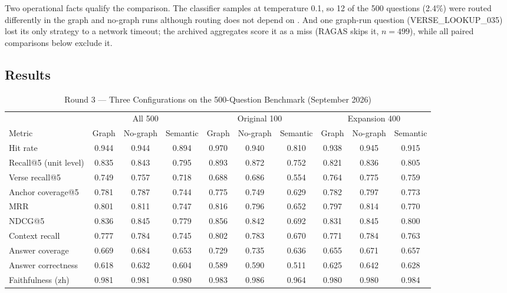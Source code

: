 Two operational facts qualify the comparison. The classifier samples at
temperature 0.1, so 12 of the 500 questions (2.4\%) were routed
differently in the graph and no-graph runs although routing does not
depend on . And one graph-run question
(VERSE\_LOOKUP\_035) lost its only strategy to a network timeout; the
archived aggregates score it as a miss (RAGAS skips it, $n=499$), while
all paired comparisons below exclude it.

\subsection{Results}

\begin{table}[!t]
\caption{Round 3 --- Three Configurations on the 500-Question Benchmark
(September 2026)}
\label{tab:round3}
\centering
\begin{threeparttable}
\begin{tabular}{@{}lccccccccc@{}}
\toprule
& \multicolumn{3}{c}{All 500} & \multicolumn{3}{c}{Original 100}
& \multicolumn{3}{c}{Expansion 400} \\
\cmidrule(lr){2-4}\cmidrule(lr){5-7}\cmidrule(lr){8-10}
Metric & Graph & No-graph & Semantic & Graph & No-graph & Semantic
& Graph & No-graph & Semantic \\
\midrule
Hit rate & 0.944 & 0.944 & 0.894 & 0.970 & 0.940 & 0.810 & 0.938 & 0.945 & 0.915 \\
Recall@5 (unit level)\tnote{a} & 0.835 & 0.843 & 0.795 & 0.893 & 0.872 & 0.752 & 0.821 & 0.836 & 0.805 \\
Verse recall@5 & 0.749 & 0.757 & 0.718 & 0.688 & 0.686 & 0.554 & 0.764 & 0.775 & 0.759 \\
Anchor coverage@5 & 0.781 & 0.787 & 0.744 & 0.775 & 0.749 & 0.629 & 0.782 & 0.797 & 0.773 \\
MRR & 0.801 & 0.811 & 0.747 & 0.816 & 0.796 & 0.652 & 0.797 & 0.814 & 0.770 \\
NDCG@5 & 0.836 & 0.845 & 0.779 & 0.856 & 0.842 & 0.692 & 0.831 & 0.845 & 0.800 \\
\midrule
Context recall & 0.777 & 0.784 & 0.745 & 0.802 & 0.783 & 0.670 & 0.771 & 0.784 & 0.763 \\
Answer coverage & 0.669 & 0.684 & 0.653 & 0.729 & 0.735 & 0.636 & 0.655 & 0.671 & 0.657 \\
Answer correctness\tnote{b} & 0.618 & 0.632 & 0.604 & 0.589 & 0.590 & 0.511 & 0.625 & 0.642 & 0.628 \\
Faithfulness (zh) & 0.981 & 0.981 & 0.980 & 0.983 & 0.986 & 0.964 & 0.980 & 0.980 & 0.984 \\

\end{tabular}
\end{threeparttable}
\end{table}
